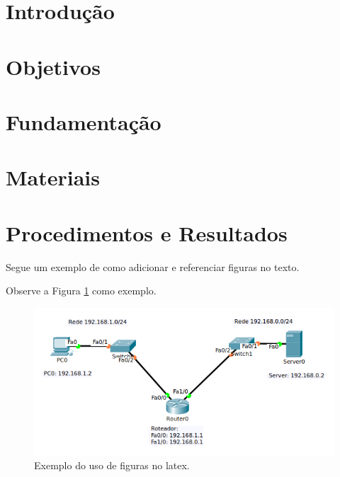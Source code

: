 \documentclass[
	12pt,				%
	oneside,   	        %
	a4paper,			%
	english,			%
	french,				%
	spanish,			%
	brazil,				%
	]{pacotes/abntex2}
\begin{document}
\textual

\makeatletter
\renewcommand{\chapter}{\@gobbletwo}
\makeatother

\section{Introdução}
\label{sec:introducao}

\section{Objetivos}
\label{sec:objetivos}

\section{Fundamentação}
\label{sec:fundamentacao}

\section{Materiais}
\label{sec:materiais}

\section{Procedimentos e Resultados}
\label{sec:procedimentos}

Segue um exemplo de como adicionar e referenciar figuras no texto.

Observe a Figura \ref{fig:minhafigura} como exemplo.

\begin{figure}[hp]
  \centering
  \includegraphics[scale=0.8]{figuras/figura_exemplo.png}
  \caption{Exemplo do uso de figuras no latex.}
  \label{fig:minhafigura}
\end{figure}
\end{document}

